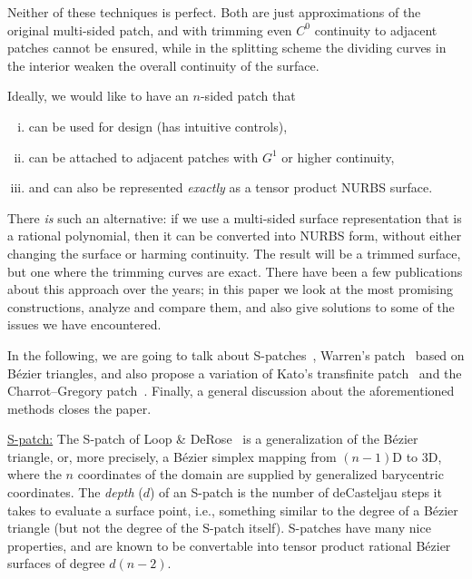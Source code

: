 \documentclass{article}
\begin{document}
Neither of these techniques is perfect. Both are just approximations of the original multi-sided
patch, and with trimming even $C^0$ continuity to adjacent patches cannot be ensured, while in the
splitting scheme the dividing curves in the interior weaken the overall continuity of the surface.

Ideally, we would like to have an $n$-sided patch that
\begin{enumerate}[i)]
\item can be used for design (has intuitive controls),
\item can be attached to adjacent patches with $G^1$ or higher continuity,
\item and can also be represented \emph{exactly} as a tensor product NURBS surface.
\end{enumerate}

There \emph{is} such an alternative:
if we use a multi-sided surface representation that is a rational polynomial,
then it can be converted into NURBS form, without either changing the surface or harming continuity.
The result will be a trimmed surface, but one where the trimming curves are exact.
There have been a few publications about this approach over the years;
in this paper we look at the most promising constructions, analyze and compare them,
and also give solutions to some of the issues we have encountered.

In the following, we are going to talk about
S-patches~\cite{spatch1},
Warren's patch~\cite{warren} based on B\'ezier triangles,
and also propose a variation of Kato's transfinite patch~\cite{kato}
and the Charrot--Gregory patch~\cite{charrot}.
Finally, a general discussion about the aforementioned methods closes the paper.

\vspace{10pt}
\noindent\underline{S-patch:}\vspace{0.2em}\newline
The S-patch of Loop \& DeRose~\cite{spatch1} is a generalization of the B\'ezier triangle, or,
more precisely, a B\'ezier simplex mapping from $(n-1)$D to 3D, where the $n$ coordinates of the
domain are supplied by generalized barycentric coordinates. The \emph{depth} ($d$) of an S-patch
is the number of deCasteljau steps it takes to evaluate a surface point, i.e., something similar
to the degree of a B\'ezier triangle (but not the degree of the S-patch itself).
S-patches have many nice properties, and are known to be convertable into tensor product
rational B\'ezier surfaces of degree $d(n-2)$.
\end{document}

